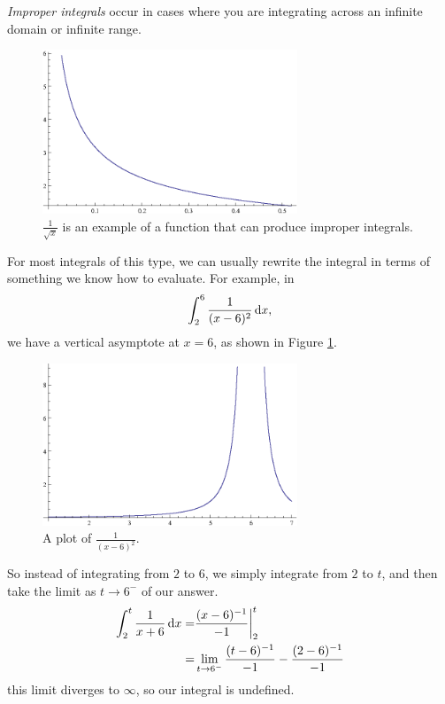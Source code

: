 \begin{defn}
\emph{Improper integrals} occur in cases where you are integrating across an infinite domain or infinite range.
\end{defn}
\begin{figure}[H]
  \begin{center}
    \includegraphics[width=3in]{continuous/integration/1sqrtx}
  \end{center}
  \caption{$\frac{1}{\sqrt{x}}$ is an example of a function that can produce improper integrals.}
\end{figure}
For most integrals of this type, we can usually rewrite the integral in terms of something we know how to evaluate.
For example, in
\begin{equation}
  \int^{6}_{2} \frac{1}{(x-6)^2} \,\mathrm{d} x,
  \label{eq:improper01}
\end{equation}
we have a vertical asymptote at $x=6$, as shown in Figure \ref{fig:improper01}.
\begin{figure}[H]
  \begin{center}
    \includegraphics[width=3in]{continuous/integration/improper_01}
  \end{center}
  \caption{A plot of $\frac{1}{(x-6)^2}$.}
  \label{fig:improper01}
\end{figure}
So instead of integrating from $2$ to $6$, we simply integrate from $2$ to $t$, and then take the limit as $t\to6^-$ of our answer.
\begin{align*}
  \int^{t}_2 \frac{1}{x+6} \,\mathrm{d} x
  =& \frac{(x-6)^{-1}}{-1} \bigg|^t_2 \\
  =& \lim_{t \to 6^-} \frac{(t-6)^{-1}}{-1}-\frac{(2-6)^{-1}}{-1}
\end{align*}
this limit diverges to $\infty$, so our integral is undefined.

